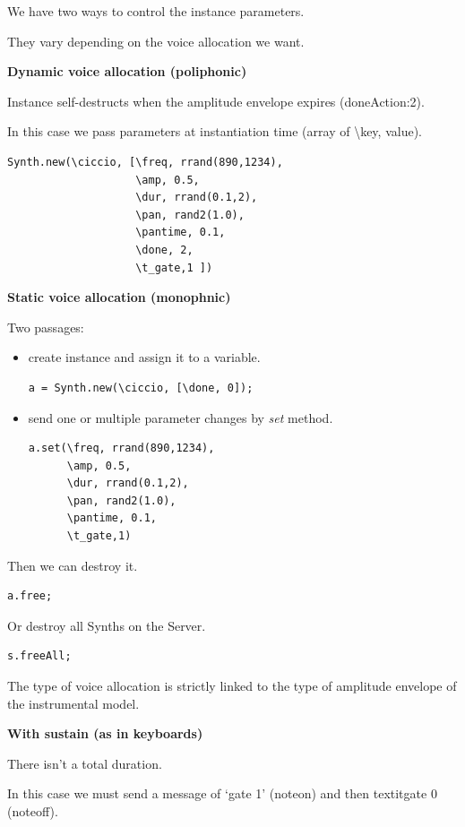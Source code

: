 We have two ways to control the instance parameters.

They vary depending on the voice allocation we want.

\textbf{Dynamic voice allocation (poliphonic)} 

Instance self-destructs when the amplitude envelope expires (doneAction:2).

In this case we pass parameters at instantiation time (array of \textbackslash key, value).

\begin{lstlisting}[frame=single] 
Synth.new(\ciccio, [\freq, rrand(890,1234), 
                    \amp, 0.5, 
                    \dur, rrand(0.1,2), 
                    \pan, rand2(1.0), 
                    \pantime, 0.1, 
                    \done, 2, 
                    \t_gate,1 ])
\end{lstlisting}
\textbf{Static voice allocation (monophnic)}

Two passages: 

\begin{itemize}
\tightlist
\item create instance and assign it to a variable.
\begin{lstlisting}[frame=single] 
a = Synth.new(\ciccio, [\done, 0]);
\end{lstlisting}
\item send one or multiple parameter changes by \textit{set} method.
\begin{lstlisting}[frame=single] 
a.set(\freq, rrand(890,1234), 
      \amp, 0.5, 
      \dur, rrand(0.1,2), 
      \pan, rand2(1.0), 
      \pantime, 0.1, 
      \t_gate,1)
\end{lstlisting}
\end{itemize}

Then we can destroy it.

\begin{lstlisting}[frame=single] 
a.free;
\end{lstlisting}
Or destroy all Synths on the Server.

\begin{lstlisting}[frame=single] 
s.freeAll;
\end{lstlisting}
The type of voice allocation is strictly linked to the type of amplitude envelope of the instrumental model.

\textbf{With sustain (as in keyboards)}

There isn't a total duration.

In this case we must send a message of `gate 1' (noteon) and then textit{gate 0} (noteoff).

